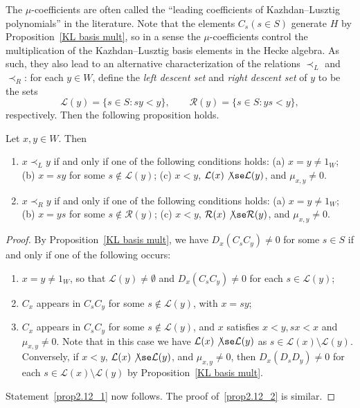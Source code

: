 \noindent The $\mu$-coefficients are often called the ``leading coefficients
of Kazhdan--Lusztig polynomials'' in the literature. Note that the elements $C_s (s\in S)$ generate $H$ by Proposition~\ref{KL basis mult}, so in a sense the $\mu$-coefficients control the
multiplication of the Kazhdan--Lusztig basis elements in the Hecke algebra. As
such, they also lead to an alternative characterization of the relations
$\prec_L$ and $\prec_R$: for each $y\in W$, define the \emph{left descent set} and
\emph{right descent set} of $y$ to be the sets
\[
 \mathcal{L}(y)=\{s\in S:sy<y\},\qquad \mathcal{R}(y)=\{s\in S:ys<y\},
\]
respectively. Then the following proposition holds.

\begin{prop}
 \label{alternative prec}
 Let $x,y\in W$. Then
 \begin{enumerate}
 \item\label{prop2.12_1} $x\prec_L y$ if and only if one of the following conditions holds:
 \textup{(}a\textup{)} $x=y\neq 1_W$;
 \textup{(}b\textup{)} $x=sy$ for some $s\notin
 \mathcal{L}(y)$; \textup{(}c\textup{)} $x<y$, $\mathcal{L}(x)\not\se \mathcal{L}(y)$, and
 $\mu_{x,y}\neq 0$.
 \item\label{prop2.12_2} $x\prec_R y$ if and only if one of the following conditions holds:
 \textup{(}a\textup{)} $x=y\neq 1_W$;
 \textup{(}b\textup{)} $x=ys$ for some $s\notin
 \mathcal{R}(y)$; \textup{(}c\textup{)} $x<y$, $\mathcal{R}(x)\not\se \mathcal{R}(y)$, and
 $\mu_{x,y}\neq 0$.
 \end{enumerate}
\end{prop}
\begin{proof}
 By Proposition~\ref{KL basis mult}, we have $D_x(C_sC_y)\neq 0$ for some $s\in S$ if and only if one of the following occurs:
 \begin{enumerate}[(\alph*)]
 \item %
 $x=y\neq 1_W$, so that $\mathcal{L}(y)\neq \emptyset$ and $D_x(C_sC_y)\neq 0$ for each $s\in
 \mathcal{L}(y)$;
 \item %
 $C_x$ appears in $C_sC_y$ for some $s\not\in \mathcal{L}(y)$, with $x=sy$;
 \item %
 $C_x$ appears in $C_sC_y$ for some $s\not\in \mathcal{L}(y)$, and $x$
 satisfies $x<y, sx<x$ and $\mu_{x,y}\neq 0$. Note that in this case
 we have $\mathcal{L}(x)\not\se\mathcal{L}(y)$ as $s\in
 \mathcal{L}(x)\setminus \mathcal{L}(y)$. Conversely, 
 if $x<y$, $\mathcal{L}(x)\not\se\mathcal{L}(y)$, and $\mu_{x,y}\neq 0$,
 then 
 $D_x(D_sD_y)\neq 0$ for each $s\in \mathcal{L}(x)\setminus
 \mathcal{L}(y)$ by Proposition~\ref{KL basis mult}.
 \end{enumerate}
 Statement~\eqref{prop2.12_1} now follows. The proof of~\eqref{prop2.12_2}
 is similar.
\end{proof}

